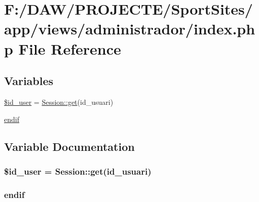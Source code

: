 \hypertarget{app_2views_2administrador_2index_8php}{}\section{F\+:/\+D\+A\+W/\+P\+R\+O\+J\+E\+C\+T\+E/\+Sport\+Sites/app/views/administrador/index.php File Reference}
\label{app_2views_2administrador_2index_8php}
\subsection*{Variables}
\begin{DoxyCompactItemize}
\item 
\hyperlink{app_2views_2administrador_2index_8php_a076f4e9335db95bc9db9c2695d128809}{\$id\+\_\+user} = \hyperlink{class_session_acf4e501ef0dfb6e98762fbecc9d75b9a}{Session\+::get}(\textquotesingle{}id\+\_\+usuari\textquotesingle{})
\item 
\hyperlink{app_2views_2administrador_2index_8php_a82cd33ca97ff99f2fcc5e9c81d65251b}{endif}
\end{DoxyCompactItemize}


\subsection{Variable Documentation}
\hypertarget{app_2views_2administrador_2index_8php_a076f4e9335db95bc9db9c2695d128809}{}
\subsubsection[{\$id\+\_\+user}]{\setlength{\rightskip}{0pt plus 5cm}\$id\+\_\+user = {\bf Session\+::get}(\textquotesingle{}id\+\_\+usuari\textquotesingle{})}\label{app_2views_2administrador_2index_8php_a076f4e9335db95bc9db9c2695d128809}
\hypertarget{app_2views_2administrador_2index_8php_a82cd33ca97ff99f2fcc5e9c81d65251b}{}
\subsubsection[{endif}]{\setlength{\rightskip}{0pt plus 5cm}endif}\label{app_2views_2administrador_2index_8php_a82cd33ca97ff99f2fcc5e9c81d65251b}
